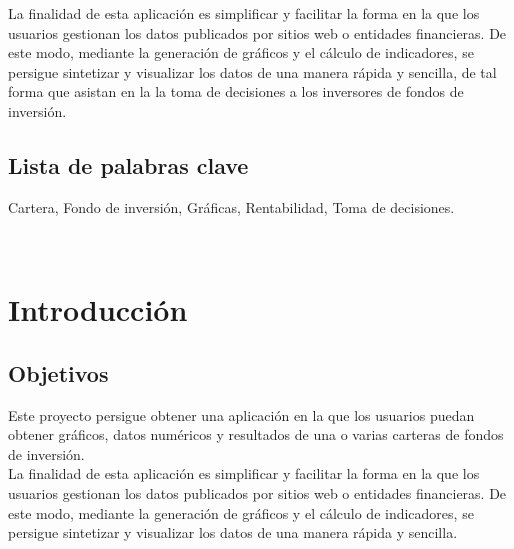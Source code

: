 \documentclass[12pt, a4paper]{book}
\begin{document}
La finalidad de esta aplicación es simplificar y facilitar la forma en la que los usuarios gestionan los datos publicados por sitios web o entidades financieras. De este modo, mediante la generación de gráficos y el cálculo de indicadores, se persigue sintetizar y visualizar los datos de una manera rápida y sencilla, de tal forma que asistan en la la toma de decisiones a los inversores de fondos de inversión.
\vspace{7cm}

\section*{Lista de palabras clave} %

 Cartera, Fondo de inversión, Gráficas, Rentabilidad, Toma de decisiones.




\newpage
$\ $
\thispagestyle{empty} %

\newpage
\tableofcontents
\newpage

\listoffigures %
\newpage

\listoftables %
\newpage


\chapter{Introducción}

\section{Objetivos}

Este proyecto persigue obtener una aplicación en la que los usuarios puedan obtener gráficos, datos numéricos y resultados de una o varias carteras de fondos de inversión.\\

La finalidad de esta aplicación es simplificar y facilitar la forma en la que los usuarios gestionan los datos publicados por sitios web o entidades financieras. De este modo, mediante la generación de gráficos y el cálculo de indicadores, se persigue sintetizar y visualizar los datos de una manera rápida y sencilla.\\
\end{document}
